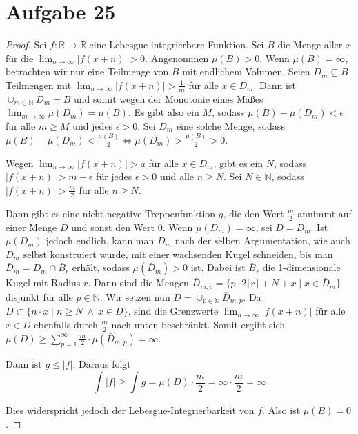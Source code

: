 \documentclass[10pt,a4paper]{article}
\begin{document}
\section{Aufgabe 25}
\begin{proof}
  Sei $f : \mathbb{R} \rightarrow \mathbb{R}$ eine Lebesgue-integrierbare Funktion.
  Sei $B$ die Menge aller $x$ für die $\lim_{n \rightarrow \infty} |f(x + n)| > 0$.
  Angenommen $\mu(B) > 0$.
  Wenn $\mu(B) = \infty$, betrachten wir nur eine Teilmenge von $B$ mit endlichem Volumen.
  Seien $D_{m} \subseteq B$ Teilmengen mit $\lim_{n \rightarrow \infty} |f(x + n)| > \frac{1}{m}$ für alle $x \in D_{m}$.
  Dann ist $\cup_{m \in \mathbb{N}} D_{m} = B$ und somit wegen der Monotonie eines Maßes $\lim_{m \rightarrow \infty} \mu(D_{m}) = \mu(B)$.
  Es gibt also ein $M$, sodass $\mu(B) - \mu(D_{m}) < \epsilon$ für alle $m \ge M$ und jedes $\epsilon > 0$.
  Sei $D_{m}$ eine solche Menge, sodass $\mu(B) - \mu(D_{m}) < \frac{\mu(B)}{2} \Leftrightarrow \mu(D_{m}) > \frac{\mu(B)}{2} > 0$.

  Wegen $\lim_{n \rightarrow \infty} |f(x + n)| > a$ für alle $x \in D_{m}$, gibt es ein $N$, sodass $|f(x + n)| > m - \epsilon$ für jedes $\epsilon > 0$ und alle $n \ge N$.
  Sei $N \in \mathbb{N}$, sodass $|f(x + n)| > \frac{m}{2}$ für alle $n \ge N$.
  
  Dann gibt es eine nicht-negative Treppenfunktion $g$, die den Wert $\frac{m}{2}$ annimmt auf einer Menge $D$ und sonst den Wert 0.
  Wenn $\mu(D_{m}) = \infty$, sei $D = D_{m}$.
  Ist $\mu(D_{m})$ jedoch endlich, kann man $D_{m}$ nach der selben Argumentation, wie auch $D_{m}$ selbst konstruiert wurde, mit einer wachsenden Kugel schneiden, bis man $\bar{D}_{m} = D_{m} \cap \bar{B}_{r}$ erhält, sodass $\mu(\bar{D}_{m}) > 0$ ist.
  Dabei ist $\bar{B}_{r}$ die 1-dimensionale Kugel mit Radius $r$.
  Dann sind die Mengen $\bar{D}_{m, p} = \{ p \cdot 2 \lceil r \rceil + N + x \mid x \in \bar{D}_{m} \}$ disjunkt für alle $p \in \mathbb{N}$.
  Wir setzen nun $D = \cup_{p \in \mathbb{N}} \bar{D}_{m, p}$.
  Da $D \subset \{ n \cdot x \mid n \ge N\ \land\ x \in D \}$, sind die Grenzwerte $\lim_{n \rightarrow \infty} |f(x + n)|$ für alle $x \in D$ ebenfalls durch $\frac{m}{2}$ nach unten beschränkt.
  Somit ergibt sich $\mu(D) \ge \sum_{p = 1}^{\infty} \frac{m}{2} \cdot \mu(\bar{D}_{m,p}) = \infty$.
  
  Dann ist $g \le |f|$.
  Daraus folgt
  \begin{equation}
    \int |f| \ge \int g = \mu(D) \cdot \frac{m}{2} = \infty \cdot \frac{m}{2} = \infty
  \end{equation}
  
  Dies widerspricht jedoch der Lebesgue-Integrierbarkeit von $f$.
  Also ist $\mu(B) = 0$.
\end{proof}
\end{document}
